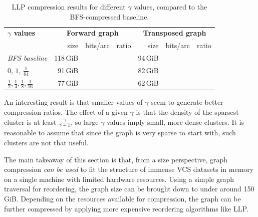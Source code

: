 \begin{table}
  \centering
  \caption{LLP compression results for different $\gamma$ values, compared to
    the BFS-compressed baseline.}%
  \label{tab:compression-llp-gammas}

  \renewcommand{\arraystretch}{1.5}
  \begin{tabular}{l r r r r r r}
      \hline \textbf{$\gamma$ values} \hspace{4em}
      & \multicolumn{3}{c}{\textbf{Forward graph}}
      & \multicolumn{3}{c}{\textbf{Transposed graph}} \\

      & size & bits/arc & ratio
      & size & bits/arc & ratio \\

      \hline \emph{BFS baseline}
      & 118\,GiB & \TODO{} & \TODO{}
      & 94\,GiB & \TODO{} & \TODO{} \\

      \hline $0$, $1$, $\frac{1}{64}$
      & 91\,GiB & \TODO{} & \TODO{}
      & 82\,GiB & \TODO{} & \TODO{} \\

      \hline $\frac{1}{2}, \frac{1}{4}, \frac{1}{8}, \frac{1}{16}$
      & 77\,GiB & \TODO{} & \TODO{}
      & 62\,GiB & \TODO{} & \TODO{} \\
    \hline
  \end{tabular}
\end{table}


An interesting result is that smaller values of $\gamma$ seem to generate
better compression ratios.
The effect of a given $\gamma$ is that the density of the sparsest cluster is
at least $\frac{\gamma}{\gamma+1}$, so large $\gamma$ values imply small, more
dense clusters.  It is reasonable to assume that since the graph is very sparse
to start with, such clusters are not that useful.

\bigskip

The main takeaway of this section is that, from a size perspective, graph
compression \emph{can be used} to fit the structure of immense VCS datasets in
memory on a single machine with limited hardware resources. Using a simple
graph traversal for reordering, the graph size can be brought down to under
around 150 GiB. Depending on the resources available for compression, the
graph can be further compressed by applying more expensive reordering
algorithms like \gls{LLP}.



